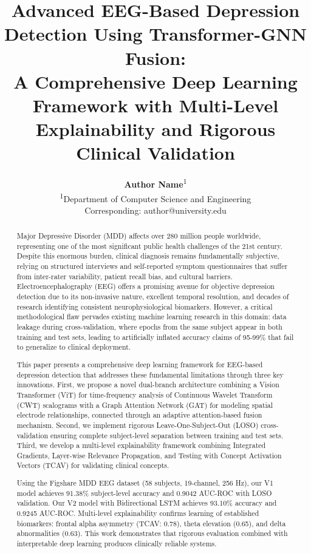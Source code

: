 \documentclass[blue,fullpaper]{ludusofficial}  %
\title{Advanced EEG-Based Depression Detection Using Transformer-GNN Fusion:\\[8pt]A Comprehensive Deep Learning Framework with Multi-Level Explainability and Rigorous Clinical Validation}
\author{%
    \textbf{Author Name}\textsuperscript{1}\\[0.2cm]
    \mdseries\small\textsuperscript{1}Department of Computer Science and Engineering\\
    \small Corresponding: author@university.edu
}
\begin{document}
\begin{abstract}
Major Depressive Disorder (MDD) affects over 280 million people worldwide, representing one of the most significant public health challenges of the 21st century. Despite this enormous burden, clinical diagnosis remains fundamentally subjective, relying on structured interviews and self-reported symptom questionnaires that suffer from inter-rater variability, patient recall bias, and cultural barriers. Electroencephalography (EEG) offers a promising avenue for objective depression detection due to its non-invasive nature, excellent temporal resolution, and decades of research identifying consistent neurophysiological biomarkers. However, a critical methodological flaw pervades existing machine learning research in this domain: data leakage during cross-validation, where epochs from the same subject appear in both training and test sets, leading to artificially inflated accuracy claims of 95-99\% that fail to generalize to clinical deployment.

This paper presents a comprehensive deep learning framework for EEG-based depression detection that addresses these fundamental limitations through three key innovations. First, we propose a novel dual-branch architecture combining a Vision Transformer (ViT) for time-frequency analysis of Continuous Wavelet Transform (CWT) scalograms with a Graph Attention Network (GAT) for modeling spatial electrode relationships, connected through an adaptive attention-based fusion mechanism. Second, we implement rigorous Leave-One-Subject-Out (LOSO) cross-validation ensuring complete subject-level separation between training and test sets. Third, we develop a multi-level explainability framework combining Integrated Gradients, Layer-wise Relevance Propagation, and Testing with Concept Activation Vectors (TCAV) for validating clinical concepts.

Using the Figshare MDD EEG dataset (58 subjects, 19-channel, 256 Hz), our V1 model achieves 91.38\% subject-level accuracy and 0.9042 AUC-ROC with LOSO validation. Our V2 model with Bidirectional LSTM achieves 93.10\% accuracy and 0.9245 AUC-ROC. Multi-level explainability confirms learning of established biomarkers: frontal alpha asymmetry (TCAV: 0.78), theta elevation (0.65), and delta abnormalities (0.63). This work demonstrates that rigorous evaluation combined with interpretable deep learning produces clinically reliable systems.
\end{abstract}
\end{document}
